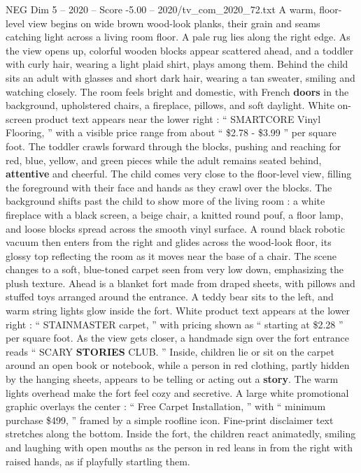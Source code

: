 \begin{textsample}{NEG Dim 5 – 2020 – Score -5.00 – 2020/tv\_com\_2020\_72.txt}  \label{ex:f5_neg_033}
A warm, floor-level view begins on wide brown wood-look planks, their grain and seams catching light across a living room floor.
A pale rug lies along the right edge.
As the view opens up, colorful wooden blocks appear scattered ahead, and a toddler with curly hair, wearing a light plaid shirt, plays among them.
Behind the child sits an adult with glasses and short dark hair, wearing a tan sweater, smiling and watching closely.
The room feels bright and domestic, with French \textbf{doors} in the background, upholstered chairs, a fireplace, pillows, and soft daylight.
White on-screen product text appears near the lower right : “ SMARTCORE Vinyl Flooring, ” with a visible price range from about “ \$2.78 - \$3.99 ” per square foot.
The toddler crawls forward through the blocks, pushing and reaching for red, blue, yellow, and green pieces while the adult remains seated behind, \textbf{attentive} and cheerful.
The child comes very close to the floor-level view, filling the foreground with their face and hands as they crawl over the blocks.
The background shifts past the child to show more of the living room : a white fireplace with a black screen, a beige chair, a knitted round pouf, a floor lamp, and loose blocks spread across the smooth vinyl surface.
A round black robotic vacuum then enters from the right and glides across the wood-look floor, its glossy top reflecting the room as it moves near the base of a chair.
The scene changes to a soft, blue-toned carpet seen from very low down, emphasizing the plush texture.
Ahead is a blanket fort made from draped sheets, with pillows and stuffed toys arranged around the entrance.
A teddy bear sits to the left, and warm string lights glow inside the fort.
White product text appears at the lower right : “ STAINMASTER carpet, ” with pricing shown as “ starting at \$2.28 ” per square foot.
As the view gets closer, a handmade sign over the fort entrance reads “ SCARY \textbf{STORIES} CLUB. ” Inside, children lie or sit on the carpet around an open book or notebook, while a person in red clothing, partly hidden by the hanging sheets, appears to be telling or acting out a \textbf{story}.
The warm lights overhead make the fort feel cozy and secretive.
A large white promotional graphic overlays the center : “ Free Carpet Installation, ” with “ minimum purchase \$499, ” framed by a simple roofline icon.
Fine-print disclaimer text stretches along the bottom.
Inside the fort, the children react animatedly, smiling and laughing with open mouths as the person in red leans in from the right with raised hands, as if playfully startling them.

\end{textsample}
